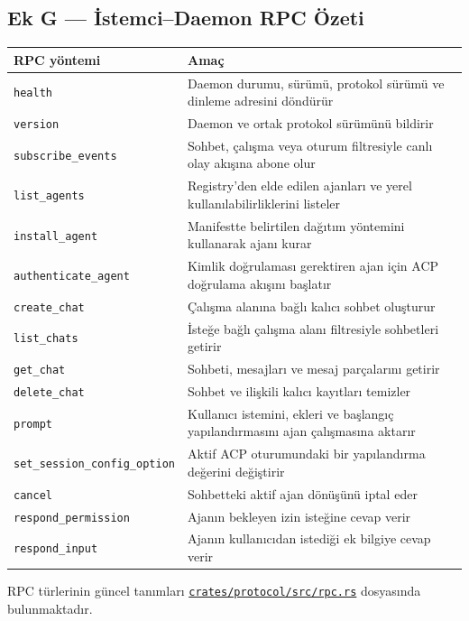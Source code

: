 \documentclass[
  turkish,
  10pt,
  a4paper,
]{article}
\begin{document}
\subsection{Ek G --- İstemci--Daemon RPC
Özeti}\label{ek-g--iux307stemcidaemon-rpc-uxf6zeti}

\begin{longtable}[]{@{}ll@{}}
\toprule\noalign{}
RPC yöntemi & Amaç \\
\midrule\noalign{}
\endhead
\bottomrule\noalign{}
\endlastfoot
\texttt{health} & Daemon durumu, sürümü, protokol sürümü ve dinleme
adresini döndürür \\
\texttt{version} & Daemon ve ortak protokol sürümünü bildirir \\
\texttt{subscribe\_events} & Sohbet, çalışma veya oturum filtresiyle
canlı olay akışına abone olur \\
\texttt{list\_agents} & Registry'den elde edilen ajanları ve yerel
kullanılabilirliklerini listeler \\
\texttt{install\_agent} & Manifestte belirtilen dağıtım yöntemini
kullanarak ajanı kurar \\
\texttt{authenticate\_agent} & Kimlik doğrulaması gerektiren ajan için
ACP doğrulama akışını başlatır \\
\texttt{create\_chat} & Çalışma alanına bağlı kalıcı sohbet oluşturur \\
\texttt{list\_chats} & İsteğe bağlı çalışma alanı filtresiyle sohbetleri
getirir \\
\texttt{get\_chat} & Sohbeti, mesajları ve mesaj parçalarını getirir \\
\texttt{delete\_chat} & Sohbet ve ilişkili kalıcı kayıtları temizler \\
\texttt{prompt} & Kullanıcı istemini, ekleri ve başlangıç
yapılandırmasını ajan çalışmasına aktarır \\
\texttt{set\_session\_config\_option} & Aktif ACP oturumundaki bir
yapılandırma değerini değiştirir \\
\texttt{cancel} & Sohbetteki aktif ajan dönüşünü iptal eder \\
\texttt{respond\_permission} & Ajanın bekleyen izin isteğine cevap
verir \\
\texttt{respond\_input} & Ajanın kullanıcıdan istediği ek bilgiye cevap
verir \\
\end{longtable}

RPC türlerinin güncel tanımları
\href{https://github.com/amar-jay/amarcode/blob/main/crates/protocol/src/rpc.rs}{\texttt{crates/protocol/src/rpc.rs}}
dosyasında bulunmaktadır.
\end{document}
